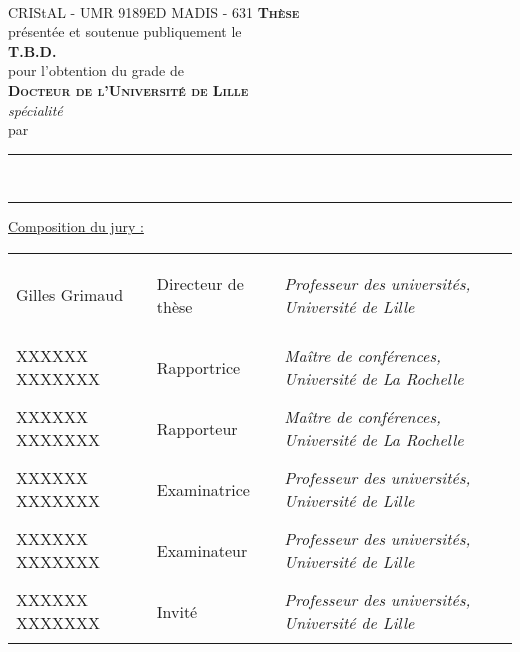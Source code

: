 \begin{titlepage}
    \sffamily
    \begin{center}
	{
        	\def\svgwidth{20 em}
		\\
		{\tiny{CRIStAL - UMR 9189}\hfil{ED MADIS - 631}}
	}
        \vfil
	{
		{
			{\Huge{\textsc{\textbf{Thèse}}}}
		}\\[1 em]
		{
			{présentée et soutenue publiquement le}\\
			{\textbf{T.B.D.}}
		}\\[1 em]
		{
			{pour l'obtention du grade de}\\
			{\LARGE{\textsc{\textbf{Docteur de l'Université de Lille}}}}\\
			{\large\textit{spécialité \printProgram}}
		}\\[1 em]
		{
			{par}\\[0.3 em]
			{\Large\textbf{\printAuthor}}
		}
	}
        \vfil
        {\LARGE
            \rule[1 ex]{\textwidth}{1.5 pt}
            \onehalfspacing\printTitleBold\\[1 ex]
            \rule[-1 ex]{\textwidth}{1.5 pt}
        }
    \end{center}
    
    \vfil
	{\small \centering \underline{Composition du jury :}}
    \begin{table}[h]
	\small
        \sffamily 
        {%
	    \begin{tabular}{
		>{\raggedright\arraybackslash}p{}
		>{\bfseries\raggedright\arraybackslash}p{}%
		>{\itshape\raggedleft\arraybackslash}p{}
	    }
		Gilles Grimaud	& Directeur de thèse	& Professeur des universités, Université de Lille\\
		XXXXXX XXXXXXX	& Rapportrice		& Maître de conférences, Université de La Rochelle\\
		XXXXXX XXXXXXX	& Rapporteur		& Maître de conférences, Université de La Rochelle\\
		XXXXXX XXXXXXX	& Examinatrice		& Professeur des universités, Université de Lille\\
		XXXXXX XXXXXXX	& Examinateur		& Professeur des universités, Université de Lille\\
		XXXXXX XXXXXXX	& Invité		& Professeur des universités, Université de Lille\\
            \end{tabular}
        }
    \end{table}
\end{titlepage}

\restoregeometry
